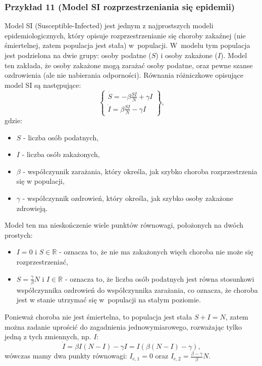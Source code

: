 \documentclass{article}
\begin{document}
    \subsubsection{Przykład 11 (Model SI rozprzestrzeniania się epidemii)}
    Model SI (Susceptible-Infected) jest jednym z najprostszych modeli
    epidemiologicznych, który opisuje rozprzestrzenianie się choroby zakaźnej
    (nie śmiertelnej, zatem populacja jest stała) w~populacji. W~modelu tym populacja jest podzielona na dwie grupy:
    osoby podatne ($S$) i osoby zakażone ($I$). Model ten zakłada, że osoby zakażone
    mogą zarażać osoby podatne, oraz pewne szanse ozdrowienia (ale nie nabierania
    odporności).
    Równania różniczkowe opisujące model SI są następujące:
    \begin{equation}
        \label{eq:si_model}
        \left\{
        \begin{array}{l}
             \dot{S} = -\beta \frac{SI}{N} + \gamma I\\
             \dot{I} = \beta \frac{SI}{N} - \gamma I
        \end{array}
        \right\},
    \end{equation}
    gdzie:
    \begin{itemize}
        \item $S$ - liczba osób podatnych,
        \item $I$ - liczba osób zakażonych,
        \item $\beta$ - współczynnik zarażania, który określa, jak szybko choroba rozprzestrzenia się w populacji,
        \item $\gamma$ - współczynnik ozdrowień, który określa, jak szybko osoby zakażone zdrowieją.
    \end{itemize}
    Model ten ma nieskończenie wiele punktów równowagi, położonych na dwóch
    prostych:
    \begin{itemize}
        \item $I=0$ i $S \in \mathbb{R}$ - oznacza to, że nie ma zakażonych
        więch choroba nie może się rozprzestrzeniać,
        \item $S = \frac{\gamma}{\beta}N$ i $I \in \mathbb{R}$ - oznacza to, że
        liczba osób podatnych jest równa stosunkowi współczynnika ozdrowień do
        współczynnika zarażania, co oznacza, że choroba jest w stanie utrzymać
        się w~populacji na stałym poziomie.
    \end{itemize}
    Ponieważ choroba nie jest śmiertelna, to populacja jest stała $S+I=N$,
    zatem można zadanie uprościć do zagadnienia jednowymiarowego,
    rozważając tylko jedną z tych zmiennych, np. $I$:
    \begin{equation}
    \label{eq:si_model_reduced}
        \dot{I} = \beta I(N - I) - \gamma I = I(\beta (N - I) - \gamma),
    \end{equation}
    wówczas mamy dwa punkty równowagi: $I_{e,1} = 0$ oraz $I_{e,2} =
    \frac{\beta-\gamma}{\beta}N$.
    
\end{document}
